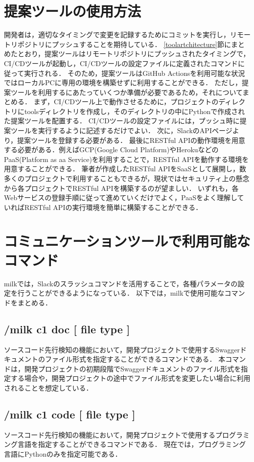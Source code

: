 \section{提案ツールの使用方法}
開発者は，適切なタイミングで変更を記録するためにコミットを実行し，リモートリポジトリにプッシュすることを期待している．
\ref{toolartchitecture}節にまとめたとおり，提案ツールはリモートリポジトリにプッシュされたタイミングで，CI/CDツールが起動し，CI/CDツールの設定ファイルに定義されたコマンドに従って実行される．
そのため，提案ツールはGitHub Actionsを利用可能な状況ではローカルPCに専用の環境を構築せずに利用することができる．
ただし，提案ツールを利用するにあたっていくつか準備が必要であるため，それについてまとめる．
まず，CI/CDツール上で動作させるために，プロジェクトのディレクトリにtoolsディレクトリを作成し，そのディレクトリの中にPythonで作成された提案ツールを配置する．
CI/CDツールの設定ファイルには，プッシュ時に提案ツールを実行するように記述するだけでよい．
次に，SlackのAPIページより，提案ツールを登録する必要がある．
最後にRESTful APIの動作環境を用意する必要がある．例えばGCP(Google Cloud Platform)やHerokuなどのPaaS(Platform as aa Service)を利用することで，RESTful APIを動作する環境を用意することができる．
筆者が作成したRESTful APIをSaaSとして展開し，数多くのプロジェクトで利用することもできるが，現状ではセキュリティ上の懸念から各プロジェクトでRESTful APIを構築するのが望ましい．
いずれも，各Webサービスの登録手順に従って進めていくだけでよく，PaaSをよく理解していればRESTful APIの実行環境を簡単に構築することができる．

\section{コミュニケーションツールで利用可能なコマンド}
milkでは，Slackのスラッシュコマンドを活用することで，各種パラメータの設定を行うことができるようになっている．
以下では，milkで使用可能なコマンドをまとめる．

\subsection*{/milk c1 doc [ file type ]}
ソースコード先行検知の機能において，開発プロジェクトで使用するSwaggerドキュメントのファイル形式を指定することができるコマンドである．
本コマンドは，開発プロジェクトの初期段階でSwaggerドキュメントのファイル形式を指定する場合や，開発プロジェクトの途中でファイル形式を変更したい場合に利用されることを想定している．

\subsection*{/milk c1 code [ file type ]}
ソースコード先行検知の機能において，開発プロジェクトで使用するプログラミング言語を指定することができるコマンドである．
現在では，プログラミング言語にPythonのみを指定可能である．

